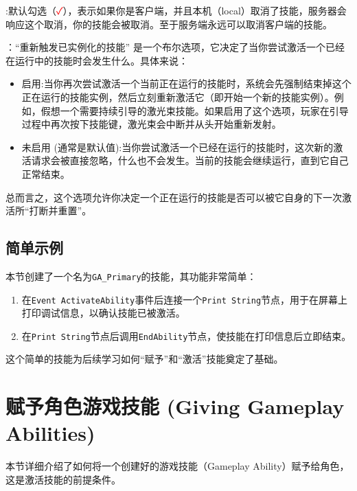 \documentclass[math,code,10pt,CJKmath]{amznotes}
\begin{document}
\begin{description}
    \item{}:默认勾选（\textcolor{red}{\faCheck}），表示如果你是客户端，并且本机（local）取消了技能，服务器会响应这个取消，你的技能会被取消。至于服务端永远可以取消客户端的技能。
    \item{}：“重新触发已实例化的技能” 是一个布尔选项，它决定了当你尝试激活一个已经在运行中的技能时会发生什么。具体来说：
    	\begin{itemize}
    	\item 启用:当你再次尝试激活一个当前正在运行的技能时，系统会先强制结束掉这个正在运行的技能实例，然后立刻重新激活它（即开始一个新的技能实例）。例如，假想一个需要持续引导的激光束技能。如果启用了这个选项，玩家在引导过程中再次按下技能键，激光束会中断并从头开始重新发射。
    	\item 未启用 (通常是默认值):当你尝试激活一个已经在运行的技能时，这次新的激活请求会被直接忽略，什么也不会发生。当前的技能会继续运行，直到它自己正常结束。
    	\end{itemize}
   总而言之，这个选项允许你决定一个正在运行的技能是否可以被它自身的下一次激活所“打断并重置”。
    
    
\end{description}

\subsection{简单示例}
本节创建了一个名为\texttt{GA\_Primary}的技能，其功能非常简单：
\begin{enumerate}
    \item 在\texttt{Event ActivateAbility}事件后连接一个\texttt{Print String}节点，用于在屏幕上打印调试信息，以确认技能已被激活。
    \item 在\texttt{Print String}节点后调用\texttt{EndAbility}节点，使技能在打印信息后立即结束。
\end{enumerate}
这个简单的技能为后续学习如何“赋予”和“激活”技能奠定了基础。


\section{赋予角色游戏技能 (Giving Gameplay Abilities)}
本节详细介绍了如何将一个创建好的游戏技能（Gameplay Ability）赋予给角色，这是激活技能的前提条件。
\end{document}
